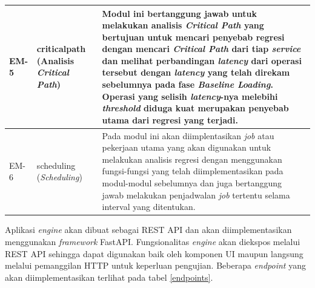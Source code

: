 \begin{small}
\begin{longtable}{ | p{1cm} | p{3cm} | p{10cm} | }
		EM-5 & critical\textunderscore path (Analisis \textit{Critical Path}) & Modul ini bertanggung jawab untuk melakukan analisis \textit{Critical Path} yang bertujuan untuk mencari penyebab regresi dengan mencari \textit{Critical Path} dari tiap \textit{service} dan melihat perbandingan \textit{latency} dari operasi tersebut dengan \textit{latency} yang telah direkam sebelumnya pada fase \textit{Baseline Loading}. Operasi yang selisih \textit{latency}-nya melebihi \textit{threshold} diduga kuat merupakan penyebab utama dari regresi yang terjadi. \\ \hline
		EM-6 & scheduling (\textit{Scheduling}) & Pada modul ini akan diimplentasikan \textit{job} atau pekerjaan utama yang akan digunakan untuk melakukan analisis regresi dengan menggunakan fungsi-fungsi yang telah diimplementasikan pada modul-modul sebelumnya dan juga bertanggung jawab melakukan penjadwalan \textit{job} tertentu selama interval yang ditentukan.  \\ \hline
	\end{longtable}
\end{small}

Aplikasi \textit{engine} akan dibuat sebagai REST API dan akan diimplementasikan menggunakan \textit{framework} FastAPI. Fungsionalitas \textit{engine} akan diekspos melalui REST API sehingga dapat digunakan baik oleh komponen UI maupun langsung melalui pemanggilan HTTP untuk keperluan pengujian. Beberapa \textit{endpoint} yang akan diimplementasikan terlihat pada tabel \ref{endpoints}.

